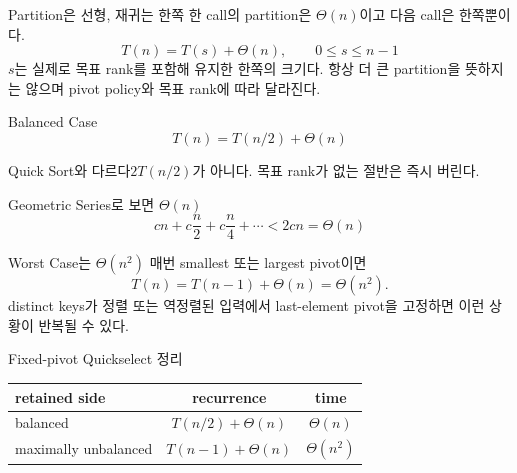 \begin{frame}{Partition은 선형, 재귀는 한쪽}
한 call의 partition은 $\Theta(n)$이고 다음 call은 한쪽뿐이다.
\[T(n)=T(s)+\Theta(n),\qquad 0\le s\le n-1\]
$s$는 실제로 목표 rank를 포함해 \alert{유지한 한쪽의 크기}다. 항상 더 큰 partition을 뜻하지는 않으며 pivot policy와 목표 rank에 따라 달라진다.
\end{frame}
\begin{frame}{Balanced Case}
\[T(n)=T(n/2)+\Theta(n)\]
\begin{alertblock}{Quick Sort와 다르다}$2T(n/2)$가 아니다. 목표 rank가 없는 절반은 즉시 버린다.\end{alertblock}
\end{frame}
\begin{frame}{Geometric Series로 보면 $\Theta(n)$}
\[cn+c\frac n2+c\frac n4+\cdots<2cn=\Theta(n)\]
\centering{}
\end{frame}
\begin{frame}{Worst Case는 $\Theta(n^2)$}
매번 smallest 또는 largest pivot이면
\[T(n)=T(n-1)+\Theta(n)=\Theta(n^2).\]
distinct keys가 정렬 또는 역정렬된 입력에서 last-element pivot을 고정하면 이런 상황이 반복될 수 있다.
\end{frame}
\begin{frame}{Fixed-pivot Quickselect 정리}
\begin{tabular}{lcc}\toprule retained side&recurrence&time\\\midrule
balanced&$T(n/2)+\Theta(n)$&$\Theta(n)$\\
maximally unbalanced&$T(n-1)+\Theta(n)$&$\Theta(n^2)$\\\bottomrule
\end{tabular}
\vfill{}
\end{frame}
